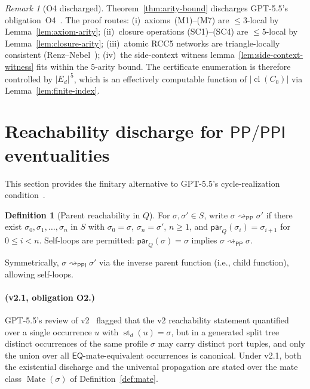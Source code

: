 \documentclass[11pt]{article}
\theoremstyle{definition}
\newtheorem{definition}[theorem]{Definition}
\theoremstyle{remark}
\newtheorem{remark}[theorem]{Remark}
\newcommand{\PP}{\mathsf{PP}}
\newcommand{\PPI}{\mathsf{PPI}}
\newcommand{\EQ}{\mathsf{EQ}}
\newcommand{\cl}{\operatorname{cl}}
\newcommand{\st}{\operatorname{st}}
\newcommand{\Mate}{\operatorname{Mate}}
\newcommand{\reach}{\rightsquigarrow}
\begin{document}
\begin{remark}[O4 discharged]\label{rem:o4-discharged}
Theorem~\ref{thm:arity-bound} discharges GPT-5.5's
obligation~O4~\cite{GPT55V2Review}.  The proof routes:
(i)~axioms~(M1)--(M7) are $\le 3$-local by
Lemma~\ref{lem:axiom-arity}; (ii)~closure operations (SC1)--(SC4)
are $\le 5$-local by Lemma~\ref{lem:closure-arity}; (iii)~atomic
RCC5 networks are triangle-locally consistent
(Renz--Nebel~\cite{RenzNebel}); (iv)~the side-context witness
lemma~\ref{lem:side-context-witness} fits within the $5$-arity
bound.  The certificate enumeration is therefore controlled by
$|E_d|^{\,5}$, which is an effectively computable function of
$|\cl(C_0)|$ via Lemma~\ref{lem:finite-index}.
\end{remark}


\section{Reachability discharge for $\PP/\PPI$ eventualities}
\label{sec:reachability}

This section provides the finitary alternative to GPT-5.5's
cycle-realization condition~\cite[Definition~6.4]{GPT55Generated}.

\begin{definition}[Parent reachability in $Q$]\label{def:parent-reach}
For $\sigma, \sigma' \in S$, write $\sigma \reach_{\PP} \sigma'$ if
there exist $\sigma_0, \sigma_1, \ldots, \sigma_n$ in $S$ with
$\sigma_0 = \sigma$, $\sigma_n = \sigma'$, $n \ge 1$, and
$\mathsf{par}_Q(\sigma_i) = \sigma_{i+1}$ for $0 \le i < n$.
Self-loops are permitted: $\mathsf{par}_Q(\sigma) = \sigma$ implies
$\sigma \reach_{\PP} \sigma$.

Symmetrically, $\sigma \reach_{\PPI} \sigma'$ via the inverse
parent function (i.e., child function), allowing self-loops.
\end{definition}

\paragraph{(v2.1, obligation O2.)}
GPT-5.5's review of v2~\cite{GPT55V2Review} flagged that the v2
reachability statement quantified over a single occurrence $u$ with
$\st_d(u) = \sigma$, but in a generated split tree distinct
occurrences of the same profile $\sigma$ may carry distinct port
tuples, and only the union over all $\EQ$-mate-equivalent occurrences
is canonical.  Under v2.1, both the existential discharge and the
universal propagation are stated over the mate class
$\Mate(\sigma)$ of Definition~\ref{def:mate}.
\end{document}
